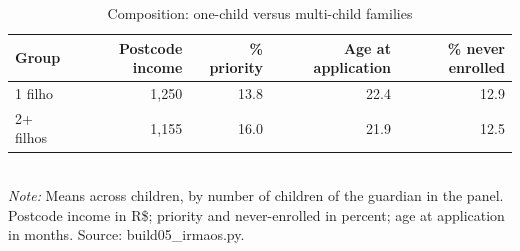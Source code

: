 \begin{table}[htbp]\centering
\caption{Composition: one-child versus multi-child families}
\label{tab:S4d_composicao}
\small
\begin{tabular}{lrrrr}
\toprule
Group & Postcode income & \% priority & Age at application & \% never enrolled \\
\midrule
1 filho & 1,250 & 13.8 & 22.4 & 12.9 \\
2+ filhos & 1,155 & 16.0 & 21.9 & 12.5 \\
\bottomrule
\end{tabular}
\\[3pt]{\footnotesize \textit{Note:} Means across children, by number of children of the guardian in the panel. Postcode income in R\$; priority and never-enrolled in percent; age at application in months. Source: build05\_irmaos.py.}
\end{table}
